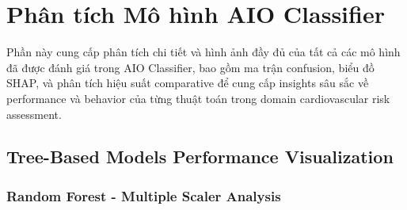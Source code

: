 \section{Phân tích Mô hình AIO Classifier}\label{subsec:comprehensive-analysis}

\noindent
Phần này cung cấp phân tích chi tiết và hình ảnh đầy đủ của tất cả các mô hình đã được đánh giá trong AIO Classifier, bao gồm ma trận confusion, biểu đồ SHAP, và phân tích hiệu suất comparative để cung cấp insights sâu sắc về performance và behavior của từng thuật toán trong domain cardiovascular risk assessment.

\subsection{Tree-Based Models Performance Visualization}

\subsubsection{Random Forest - Multiple Scaler Analysis}

